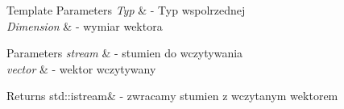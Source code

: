 \begin{DoxyTemplParams}{Template Parameters}
{\em Typ} & -\/ Typ wspolrzednej \\
\hline
{\em Dimension} & -\/ wymiar wektora \\
\hline
\end{DoxyTemplParams}

\begin{DoxyParams}{Parameters}
{\em stream} & -\/ stumien do wczytywania \\
\hline
{\em vector} & -\/ wektor wczytywany \\
\hline
\end{DoxyParams}
\begin{DoxyReturn}{Returns}
std\+::istream\& -\/ zwracamy stumien z wczytanym wektorem 
\end{DoxyReturn}
